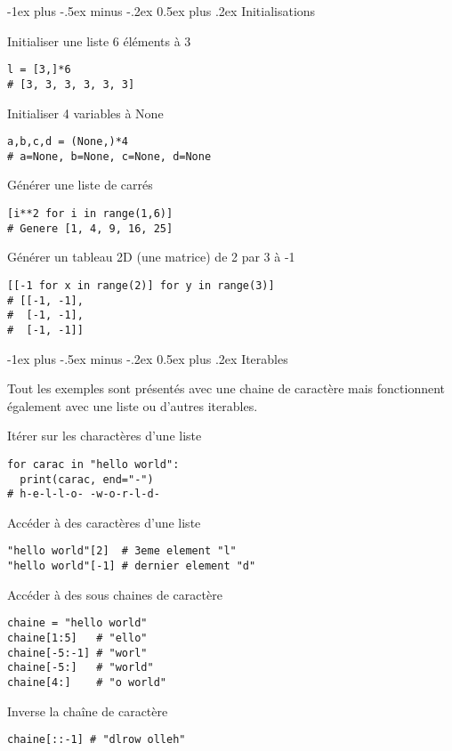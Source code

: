 \documentclass[10pt,landscape]{article}
\makeatletter
\renewcommand{\section}{\@startsection{section}{1}{0mm}%
                                {-1ex plus -.5ex minus -.2ex}%
                                {0.5ex plus .2ex}%
                                {\normalfont\large\bfseries}}
\makeatother
\begin{document}
\begin{multicols}{3}
\section{Initialisations}

Initialiser une liste 6 éléments à 3
\begin{verbatim}
l = [3,]*6
# [3, 3, 3, 3, 3, 3]
\end{verbatim}

Initialiser 4 variables à None
\begin{verbatim}
a,b,c,d = (None,)*4
# a=None, b=None, c=None, d=None
\end{verbatim}

Générer une liste de carrés
\begin{verbatim}
[i**2 for i in range(1,6)]
# Genere [1, 4, 9, 16, 25]
\end{verbatim}

Générer un tableau 2D (une matrice) de 2 par 3 à -1

\begin{verbatim}
[[-1 for x in range(2)] for y in range(3)]
# [[-1, -1],
#  [-1, -1],
#  [-1, -1]]
\end{verbatim}

\section{Iterables}

Tout les exemples sont présentés avec une chaine de caractère mais fonctionnent également avec une liste ou d'autres iterables.

Itérer sur les charactères d'une liste
\begin{verbatim}
for carac in "hello world":
  print(carac, end="-")
# h-e-l-l-o- -w-o-r-l-d-
\end{verbatim}

Accéder à des caractères d'une liste
\begin{verbatim}
"hello world"[2]  # 3eme element "l"
"hello world"[-1] # dernier element "d"
\end{verbatim}

Accéder à des sous chaines de caractère
\begin{verbatim}
chaine = "hello world"
chaine[1:5]   # "ello"
chaine[-5:-1] # "worl"
chaine[-5:]   # "world"
chaine[4:]    # "o world"
\end{verbatim}

Inverse la chaîne de caractère
\begin{verbatim}
chaine[::-1] # "dlrow olleh"
\end{verbatim}


\end{multicols}
\end{document}

